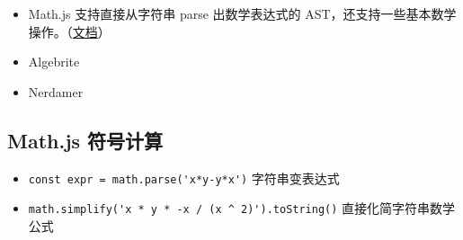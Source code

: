 
\begin{itemize}
\item Math.js 支持直接从字符串 parse 出数学表达式的 AST，还支持一些基本数学操作。（\href{https://mathjs.org/docs/expressions/algebra.html}{文档}）
\item Algebrite
\item Nerdamer
\end{itemize}

\subsection{Math.js 符号计算}
\begin{itemize}
\item \verb`const expr = math.parse('x*y-y*x')` 字符串变表达式
\item \verb`math.simplify('x * y * -x / (x ^ 2)').toString()` 直接化简字符串数学公式
\end{itemize}
